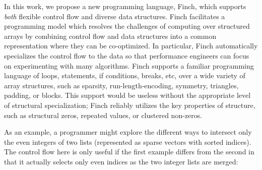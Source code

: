 In this work, we propose a new programming language, Finch, which supports \textit{both} flexible control flow and diverse data structures.
%
Finch facilitates a programming model which resolves the challenges of computing over structured arrays by combining control flow and data structures into a common representation where they can be co-optimized.
%
In particular, Finch automatically specializes the control flow to the data so that performance engineers can focus on experimenting with many algorithms.
%
Finch supports a familiar programming language of loops, statements, if conditions, breaks, etc, over a wide variety of array structures, such as sparsity, run-length-encoding, symmetry, triangles, padding, or blocks. 
%
This support would be useless without the appropriate level of structural specialization; Finch reliably utilizes the key properties of structure, such as structural zeros, repeated values, or clustered non-zeros.
%

As an example, a programmer might explore the different ways to intersect only the even integers of two lists (represented as sparse vectors with sorted indices). The control flow here is only useful if the first example differs from the second in that it actually selects only even indices as the two integer lists are merged:

%
%
%



